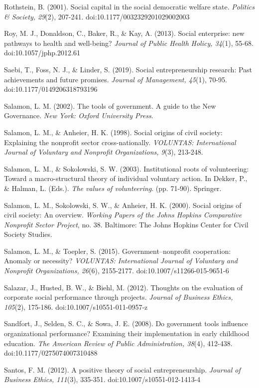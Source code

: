 \documentclass{article}
\begin{document}
Rothstein, B. (2001). Social capital in the social democratic welfare state. \emph{Politics \& Society, 29}(2), 207-241. doi:10.1177/0032329201029002003

Roy, M. J., Donaldson, C., Baker, R., \& Kay, A. (2013). Social enterprise: new pathways to health and well-being? \emph{Journal of Public Health }\emph{Holicy}\emph{, 34}(1), 55-68. doi:10.1057/jphp.2012.61

Saebi, T., Foss, N. J., \& Linder, S. (2019). Social entrepreneurship research: Past achievements and future promises. \emph{Journal of Management, 45}(1), 70-95. doi:10.1177/0149206318793196

Salamon, L. M. (2002). The tools of government. A guide to the New Governance. \emph{New York: Oxford University Press}. 

Salamon, L. M., \& Anheier, H. K. (1998). Social origins of civil society: Explaining the nonprofit sector cross-nationally. \emph{VOLUNTAS: International Journal of Voluntary and }\emph{Nonprofit}\emph{ Organizations, 9}(3), 213-248. 

Salamon, L. M., \& Sokolowski, S. W. (2003). Institutional roots of volunteering: Toward a macro-structural theory of individual voluntary action. In Dekker, P., \& Halman, L. (Eds.). \emph{The values of volunteering}. (pp. 71-90). Springer.

Salamon, L. M., Sokolowski, S. W., \& Anheier, H. K. (2000). Social origins of civil society: An overview. \emph{Working Papers of the Johns Hopkins Comparative }\emph{Nonprofit}\emph{ Sector Project}, no. 38. Baltimore: The Johns Hopkins Center for Civil Society Studies.

Salamon, L. M., \& Toepler, S. (2015). Government--nonprofit cooperation: Anomaly or necessity? \emph{VOLUNTAS: International Journal of Voluntary and }\emph{Nonprofit}\emph{ Organizations, 26}(6), 2155-2177. doi:10.1007/s11266-015-9651-6

Salazar, J., Husted, B. W., \& Biehl, M. (2012). Thoughts on the evaluation of corporate social performance through projects. \emph{Journal of Business Ethics, 105}(2), 175-186. doi:10.1007/s10551-011-0957-z

Sandfort, J., Selden, S. C., \& Sowa, J. E. (2008). Do government tools influence organizational performance? Examining their implementation in early childhood education. \emph{The American Review of Public Administration, 38}(4), 412-438. doi:10.1177/0275074007310488

Santos, F. M. (2012). A positive theory of social entrepreneurship. \emph{Journal of Business Ethics, 111}(3), 335-351. doi:10.1007/s10551-012-1413-4
\end{document}
